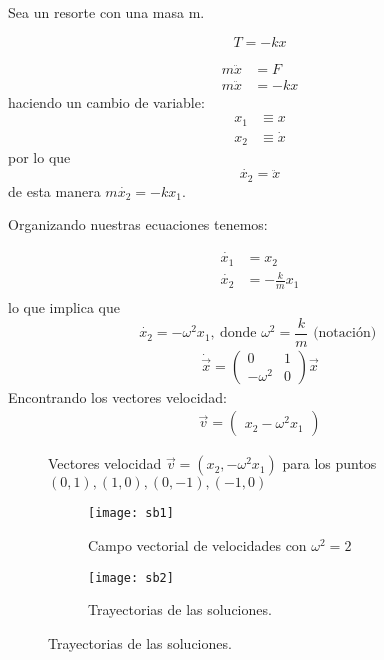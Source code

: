 \begin{ejemplo} Sea un resorte con una masa m.

  \begin{tcolorbox}[colback=Black!4, colframe=White]
  \begin{recordatorio}
  $$
  T=-kx
  $$
  \end{recordatorio}
  \end{tcolorbox}
  $$
  \begin{aligned}
    m \ddot{x} &= F \\
    m\ddot{x} &= -kx 
  \end{aligned}
  $$
  haciendo un cambio de variable:
  $$
  \begin{aligned}
    x_1 &\equiv x \\
    x_2 &\equiv \dot{x}
  \end{aligned}
  $$
  por lo que
  $$
  \dot{x_2}= \ddot{x} 
  $$
  de esta manera $m\dot{x_2}=-kx_1$.

  Organizando nuestras ecuaciones tenemos:

  $$
  \begin{aligned}
    \dot{x_1} &= x_2 \\
    \dot{x_2} &= -\frac{k}{m}x_1 \\
  \end{aligned}
  $$
  lo que implica que
  $$
   \dot{x_2}=-\omega^2x_1 , \ \text{donde } \omega^2=\frac{k}{m}  \text{ (notación) }
  $$
  $$
  \begin{aligned}
    \dot{\vec{x}}= \begin{pmatrix} 0 & 1 \\ -\omega^2 & 0 \end{pmatrix} \vec{x}  
  \end{aligned}
  $$
  Encontrando los vectores velocidad:
  $$
  \begin{aligned}
    \vec{v}=\begin{pmatrix} x_2-\omega^2x_1 \end{pmatrix}  
  \end{aligned}
  $$

\begin{figure}[ht]
    \centering
    \caption{Vectores velocidad $\vec{v}=(x_2,-\omega^2x_1)$ para los puntos $(0,1),(1,0),(0,-1),(-1,0)$}
    \label{fig:vectoresvel}
\end{figure}

\begin{figure}[!tbp]
  \begin{subfigure}[b]{0.49\textwidth}
    \texttt{[image: sb1]}
    \caption{Campo vectorial de velocidades con $\omega^2=2$}
  \end{subfigure}
  \hfill
  \begin{subfigure}[b]{0.49\textwidth}
    \texttt{[image: sb2]}
    \caption{Trayectorias de las soluciones.}
  \end{subfigure}
\end{figure}


\end{ejemplo}

